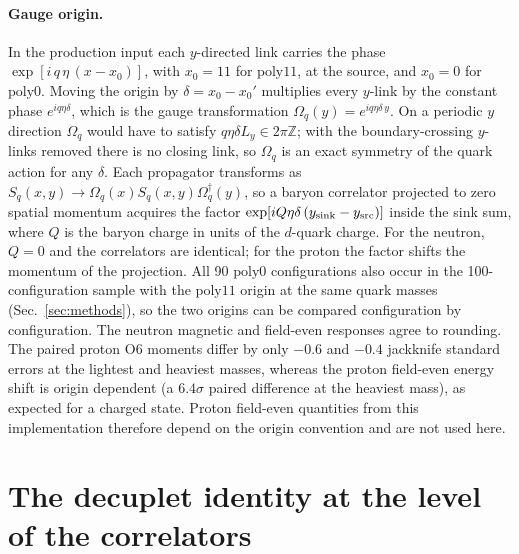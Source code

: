 \documentclass[aps,prd,reprint,twocolumn,superscriptaddress,nofootinbib,longbibliography]{revtex4-2}
\begin{document}
\paragraph{Gauge origin.} In the production input each $y$-directed link carries the phase $\exp[i\,q\,\eta\,(x-x_0)]$, with $x_0=11$ for $\mathrm{poly11}$, at the source, and $x_0=0$ for $\mathrm{poly0}$. Moving the origin by $\delta=x_0-x_0'$ multiplies every $y$-link by the constant phase $e^{iq\eta\delta}$, which is the gauge transformation $\Omega_q(y)=e^{iq\eta\delta\,y}$. On a periodic $y$ direction $\Omega_q$ would have to satisfy $q\eta\delta L_y\in2\pi\mathbb Z$; with the boundary-crossing $y$-links removed there is no closing link, so $\Omega_q$ is an exact symmetry of the quark action for any $\delta$. Each propagator transforms as $S_q(x,y)\to\Omega_q(x)S_q(x,y)\Omega_q^\dagger(y)$, so a baryon correlator projected to zero spatial momentum acquires the factor $\exp[iQ\eta\delta\,(y_{\rm sink}-y_{\rm src})]$ inside the sink sum, where $Q$ is the baryon charge in units of the $d$-quark charge. For the neutron, $Q=0$ and the correlators are identical; for the proton the factor shifts the momentum of the projection. All 90 $\mathrm{poly0}$ configurations also occur in the 100-configuration sample with the $\mathrm{poly11}$ origin at the same quark masses (Sec.~\ref{sec:methods}), so the two origins can be compared configuration by configuration. The neutron magnetic and field-even responses agree to rounding. The paired proton O6 moments differ by only $-0.6$ and $-0.4$ jackknife standard errors at the lightest and heaviest masses, whereas the proton field-even energy shift is origin dependent (a $6.4\sigma$ paired difference at the heaviest mass), as expected for a charged state. Proton field-even quantities from this implementation therefore depend on the origin convention and are not used here.

\section{The decuplet identity at the level of the correlators}
\label{app:identity}
\end{document}
